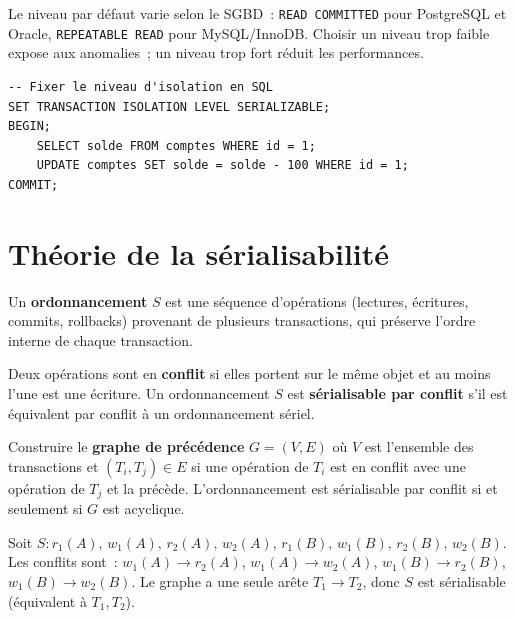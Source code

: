 \begin{attention}
Le niveau par d\'efaut varie selon le SGBD~: \texttt{READ COMMITTED} pour
PostgreSQL et Oracle, \texttt{REPEATABLE READ} pour MySQL/InnoDB. Choisir
un niveau trop faible expose aux anomalies~; un niveau trop fort r\'eduit
les performances.
\end{attention}

\begin{verbatim}
-- Fixer le niveau d'isolation en SQL
SET TRANSACTION ISOLATION LEVEL SERIALIZABLE;
BEGIN;
    SELECT solde FROM comptes WHERE id = 1;
    UPDATE comptes SET solde = solde - 100 WHERE id = 1;
COMMIT;
\end{verbatim}

\section{Th\'eorie de la s\'erialisabilit\'e}

\begin{definition}
Un \textbf{ordonnancement} $S$ est une s\'equence d'op\'erations
(lectures, \'ecritures, commits, rollbacks) provenant de plusieurs
transactions, qui pr\'eserve l'ordre interne de chaque transaction.
\end{definition}

\begin{definition}
Deux op\'erations sont en \textbf{conflit} si elles portent sur le m\^eme
objet et au moins l'une est une \'ecriture. Un ordonnancement $S$ est
\textbf{s\'erialisable par conflit} s'il est \'equivalent par conflit \`a un
ordonnancement s\'eriel.
\end{definition}

\begin{theoreme}
Construire le \textbf{graphe de pr\'ec\'edence} $G = (V, E)$ o\`u $V$ est
l'ensemble des transactions et $(T_i, T_j) \in E$ si une op\'eration de
$T_i$ est en conflit avec une op\'eration de $T_j$ et la pr\'ec\`ede.
L'ordonnancement est s\'erialisable par conflit si et seulement si $G$ est
acyclique.
\end{theoreme}

\begin{exemple}
Soit $S : r_1(A),\, w_1(A),\, r_2(A),\, w_2(A),\, r_1(B),\, w_1(B),\, r_2(B),\, w_2(B)$.
Les conflits sont~: $w_1(A) \to r_2(A)$, $w_1(A) \to w_2(A)$,
$w_1(B) \to r_2(B)$, $w_1(B) \to w_2(B)$. Le graphe a une seule ar\^ete
$T_1 \to T_2$, donc $S$ est s\'erialisable (\'equivalent \`a $T_1, T_2$).
\end{exemple}

